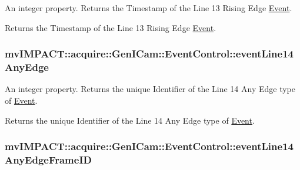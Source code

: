 An integer property. Returns the Timestamp of the Line 13 Rising Edge \hyperlink{classmv_i_m_p_a_c_t_1_1acquire_1_1_event}{Event}. 

Returns the Timestamp of the Line 13 Rising Edge \hyperlink{classmv_i_m_p_a_c_t_1_1acquire_1_1_event}{Event}. \hypertarget{classmv_i_m_p_a_c_t_1_1acquire_1_1_gen_i_cam_1_1_event_control_a39142f7b128ef3901b2f2c36b0b16cbd}{
\subsubsection[{event\+Line14\+Any\+Edge}]{ mv\+I\+M\+P\+A\+C\+T\+::acquire\+::\+Gen\+I\+Cam\+::\+Event\+Control\+::event\+Line14\+Any\+Edge}}\label{classmv_i_m_p_a_c_t_1_1acquire_1_1_gen_i_cam_1_1_event_control_a39142f7b128ef3901b2f2c36b0b16cbd}


An integer property. Returns the unique Identifier of the Line 14 Any Edge type of \hyperlink{classmv_i_m_p_a_c_t_1_1acquire_1_1_event}{Event}. 

Returns the unique Identifier of the Line 14 Any Edge type of \hyperlink{classmv_i_m_p_a_c_t_1_1acquire_1_1_event}{Event}. \hypertarget{classmv_i_m_p_a_c_t_1_1acquire_1_1_gen_i_cam_1_1_event_control_ad73cb5c047415e4161d530b41a3b69e7}{
\subsubsection[{event\+Line14\+Any\+Edge\+Frame\+I\+D}]{ mv\+I\+M\+P\+A\+C\+T\+::acquire\+::\+Gen\+I\+Cam\+::\+Event\+Control\+::event\+Line14\+Any\+Edge\+Frame\+I\+D}}\label{classmv_i_m_p_a_c_t_1_1acquire_1_1_gen_i_cam_1_1_event_control_ad73cb5c047415e4161d530b41a3b69e7}


